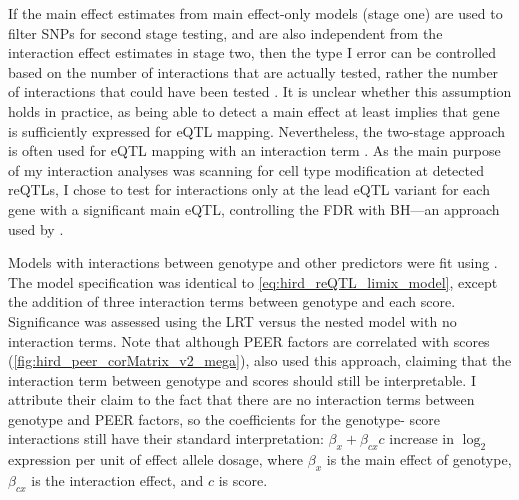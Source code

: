 %
%
If the main effect estimates from main effect-only models (stage one) are used to filter \glspl{SNP} for second stage testing,
and are also independent from the interaction effect estimates in stage two,
then the type I error can be controlled based on the number of interactions that are actually tested, rather the number of interactions that could have been tested \autocite{kooperberg2008IncreasingPowerIdentifying,peters2016InsightGenotypePhenotypeAssociations}.
It is unclear whether this assumption holds in practice, as being able to detect a main effect at least implies that gene is sufficiently expressed for \gls{eQTL} mapping.
Nevertheless, the two-stage approach is often used for \gls{eQTL} mapping with an interaction term \autocite{westra2015CellSpecificEQTL,peters2016InsightGenotypePhenotypeAssociations,kim-hellmuth2017GeneticRegulatoryEffects,davenport2018DiscoveringVivoCytokineeQTL}.
As the main purpose of my interaction analyses was scanning for cell type modification at detected \glspl{reQTL},
I chose to test for interactions only at the lead \gls{eQTL} variant for each gene with a significant main \gls{eQTL},
controlling the \gls{FDR} with \gls{BH}---an approach used by \textcite{peters2016InsightGenotypePhenotypeAssociations,kim-hellmuth2017GeneticRegulatoryEffects}.

Models with interactions between genotype and other predictors were fit using  \autocite{ziyatdinov2018Lme4qtlLinearMixed}.
The model specification was identical to \cref{eq:hird_reQTL_limix_model}, except the addition of three interaction terms between genotype and each  score.
Significance was assessed using the \gls{LRT} versus the nested model with no interaction terms.
Note that although PEER factors are correlated with  scores (\cref{fig:hird_peer_corMatrix_v2_mega}), 
\textcite{kim-hellmuth2020CellTypeSpecific} also used this approach, claiming that the interaction term between genotype and  scores should still be interpretable.
I attribute their claim to the fact that there are no interaction terms between genotype and PEER factors, so the coefficients for the genotype- score interactions still have their standard interpretation: $\beta_x + \beta_{cx}c$ increase in $\log_2$ expression per unit of effect allele dosage, where $\beta_x$ is the main effect of genotype, $\beta_{cx}$ is the interaction effect, and $c$ is  score.


